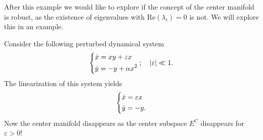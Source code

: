 After this example we would like to explore if the concept of the center manifold is robust, as the existence of eigenvalues with $ \textrm{Re} (\lambda_i) = 0$ is not. We will explore this in an example.

\begin{ex}
	Consider the following perturbed dynamical system
	\begin{align}
		\begin{dcases}
			\dot{x} = xy + \varepsilon x \\
			\dot{y} = -y + \alpha x^2
		\end{dcases}
;\quad |\varepsilon | \ll 1.
	\end{align}
The linearization of this system yields
\begin{align}
	\begin{dcases}
		\dot{x} = \varepsilon x \\
		\dot{y} = -y.
	\end{dcases}
\end{align}
Now the center manifold disappears as the center subspace $E^{C}$ disappears for $\varepsilon>0$!
\end{ex}


